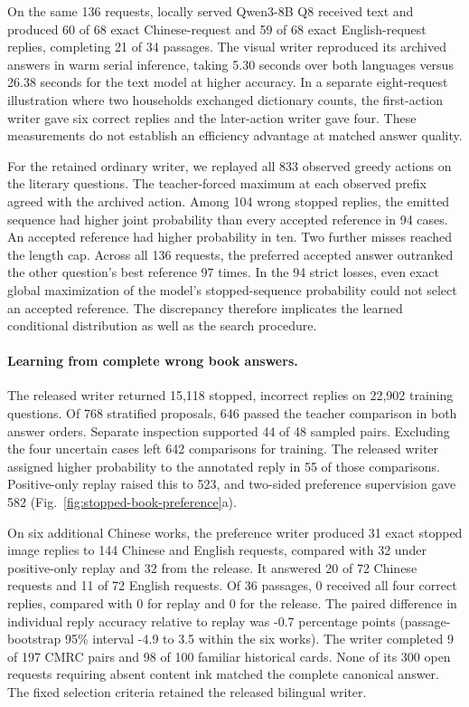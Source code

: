 \documentclass[12pt,a4paper]{article}
\providecommand{\DIFadd}[1]{{\protect\color{blue} \sf #1}} %
\begin{document}
\DIFadd{On the same 136 requests, locally served Qwen3-8B Q8 received text and produced 60 of 68 exact Chinese-request and 59 of 68 exact English-request replies, completing 21 of 34 passages. The visual writer reproduced its archived answers in warm serial inference, taking 5.30 seconds over both languages versus 26.38 seconds for the text model at higher accuracy. In a separate eight-request illustration where two households exchanged dictionary counts, the first-action writer gave six correct replies and the later-action writer gave four. These measurements do not establish an efficiency advantage at matched answer quality.
}

\DIFadd{For the retained ordinary writer, we replayed all 833 observed greedy actions on the literary questions. The teacher-forced maximum at each observed prefix agreed with the archived action. Among 104 wrong stopped replies, the emitted sequence had higher joint probability than every accepted reference in 94 cases. An accepted reference had higher probability in ten. Two further misses reached the length cap. Across all 136 requests, the preferred accepted answer outranked the other question's best reference 97 times. In the 94 strict losses, even exact global maximization of the model's stopped-sequence probability could not select an accepted reference. The discrepancy therefore implicates the learned conditional distribution as well as the search procedure.
}

\paragraph{\DIFadd{Learning from complete wrong book answers.}}
\DIFadd{The released writer returned 15,118 stopped, incorrect replies on 22,902 training questions. Of 768 stratified proposals, 646 passed the teacher comparison in both answer orders. Separate inspection supported 44 of 48 sampled pairs. Excluding the four uncertain cases left 642 comparisons for training. The released writer assigned higher probability to the annotated reply in 55 of those comparisons. Positive-only replay raised this to 523, and two-sided preference supervision gave 582 (Fig.~\ref{fig:stopped-book-preference}a).
}

\DIFadd{On six additional Chinese works, the preference writer produced 31 exact stopped image replies to 144 Chinese and English requests, compared with 32 under positive-only replay and 32 from the release. It answered 20 of 72 Chinese requests and 11 of 72 English requests. Of 36 passages, 0 received all four correct replies, compared with 0 for replay and 0 for the release. The paired difference in individual reply accuracy relative to replay was -0.7 percentage points (passage-bootstrap 95\% interval -4.9 to 3.5 within the six works). The writer completed 9 of 197 CMRC pairs and 98 of 100 familiar historical cards. None of its 300 open requests requiring absent content ink matched the complete canonical answer. The fixed selection criteria retained the released bilingual writer.
}
\end{document}
